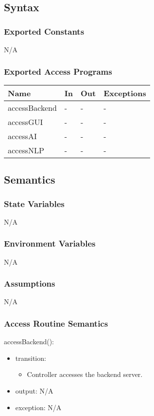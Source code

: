 \documentclass[12pt, titlepage]{article}
\begin{document}
\subsection{Syntax}

\subsubsection{Exported Constants}
N/A
\subsubsection{Exported Access Programs}

\begin{center}
\begin{tabular}{p{3cm} p{4cm} p{4cm} p{3cm}}
\hline
\textbf{Name} & \textbf{In} & \textbf{Out} & \textbf{Exceptions} \\
\hline
accessBackend & - & - & - \\
accessGUI & - & - & - \\
accessAI & - & - & - \\
accessNLP & - & - & - \\

\hline
\end{tabular}
\end{center}

\subsection{Semantics}

\subsubsection{State Variables}
N/A
\subsubsection{Environment Variables}
N/A
\subsubsection{Assumptions}
N/A
\subsubsection{Access Routine Semantics}

\noindent accessBackend():
\begin{itemize}
\item transition: \begin{itemize}
    \item Controller accesses the backend server.
\end{itemize}
\item output: N/A
\item exception: N/A
\end{itemize}
\end{document}
